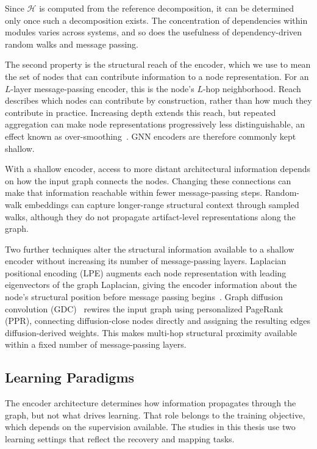Since $\mathcal{H}$ is computed from the reference decomposition, it can be determined only once such a decomposition exists. The concentration of dependencies within modules varies across systems, and so does the usefulness of dependency-driven random walks and message passing.

The second property is the structural reach of the encoder, which we use to mean the set of nodes that can contribute information to a node representation. For an $L$-layer message-passing encoder, this is the node's $L$-hop neighborhood. Reach describes which nodes can contribute by construction, rather than how much they contribute in practice. Increasing depth extends this reach, but repeated aggregation can make node representations progressively less distinguishable, an effect known as over-smoothing~\cite{gnn_oversmoothing}. GNN encoders are therefore commonly kept shallow.

With a shallow encoder, access to more distant architectural information depends on how the input graph connects the nodes. Changing these connections can make that information reachable within fewer message-passing steps. Random-walk embeddings can capture longer-range structural context through sampled walks, although they do not propagate artifact-level representations along the graph.

Two further techniques alter the structural information available to a shallow encoder without increasing its number of message-passing layers. Laplacian positional encoding (LPE) augments each node representation with leading eigenvectors of the graph Laplacian, giving the encoder information about the node's structural position before message passing begins~\cite{lpe}. Graph diffusion convolution (GDC)~\cite{gdc} rewires the input graph using personalized PageRank (PPR), connecting diffusion-close nodes directly and assigning the resulting edges diffusion-derived weights. This makes multi-hop structural proximity available within a fixed number of message-passing layers.

\subsection{Learning Paradigms \label{sec:bg_learning}}

The encoder architecture determines how information propagates through the graph, but not what drives learning. That role belongs to the training objective, which depends on the supervision available. The studies in this thesis use two learning settings that reflect the recovery and mapping tasks.

